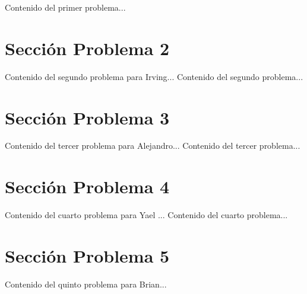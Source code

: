 \documentclass{IEEEcsmag}
\begin{document}
\newpage
Contenido del primer problema...
\newpage


\section{Sección Problema 2}
Contenido del segundo problema para Irving...
\newpage
Contenido del segundo problema...
\newpage


\section{Sección Problema 3}
Contenido del tercer problema para Alejandro...
\newpage 
Contenido del tercer problema...
\newpage 


\section{Sección Problema 4}
Contenido del cuarto problema para Yael ...
\newpage 
Contenido del cuarto problema...
\newpage 


\section{Sección Problema 5}
Contenido del quinto problema para Brian...
\newpage 
    
\end{document}
